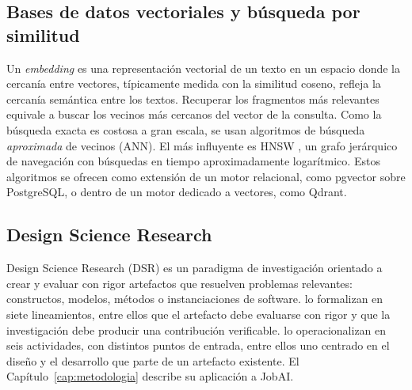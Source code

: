 \subsection{Bases de datos vectoriales y búsqueda por similitud}

Un \textit{embedding} es una representación vectorial de un texto en un espacio donde la cercanía entre vectores, típicamente medida con la similitud coseno, refleja la cercanía semántica entre los textos. Recuperar los fragmentos más relevantes equivale a buscar los vecinos más cercanos del vector de la consulta. Como la búsqueda exacta es costosa a gran escala, se usan algoritmos de búsqueda \emph{aproximada} de vecinos (ANN). El más influyente es HNSW \citep{Malkov2020}, un grafo jerárquico de navegación con búsquedas en tiempo aproximadamente logarítmico. Estos algoritmos se ofrecen como extensión de un motor relacional, como pgvector sobre PostgreSQL, o dentro de un motor dedicado a vectores, como Qdrant.

\subsection{Design Science Research}
\label{sec:marco-teorico-dsr}

Design Science Research (DSR) es un paradigma de investigación orientado a crear y evaluar con rigor artefactos que resuelven problemas relevantes: constructos, modelos, métodos o instanciaciones de software. \citet{Hevner2004} lo formalizan en siete lineamientos, entre ellos que el artefacto debe evaluarse con rigor y que la investigación debe producir una contribución verificable. \citet{Peffers2007} lo operacionalizan en seis actividades, con distintos puntos de entrada, entre ellos uno centrado en el diseño y el desarrollo que parte de un artefacto existente. El Capítulo~\ref{cap:metodologia} describe su aplicación a JobAI.
